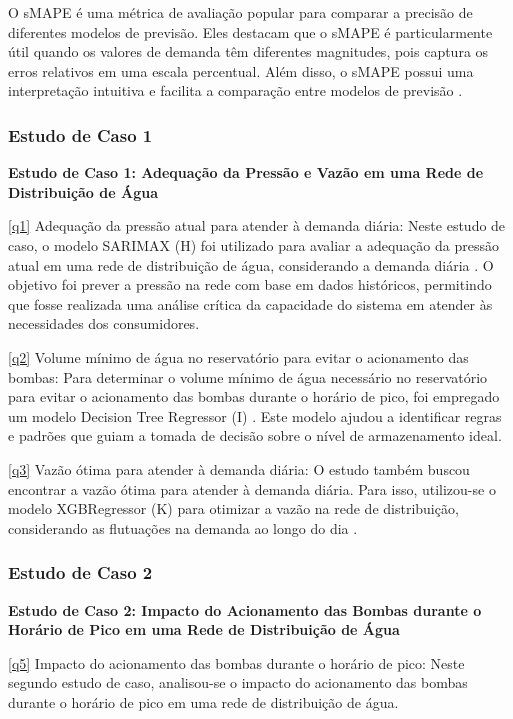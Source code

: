 O sMAPE é uma métrica de avaliação popular para comparar a precisão de diferentes modelos de previsão. Eles destacam que o sMAPE é particularmente útil quando os valores de demanda têm diferentes magnitudes, pois captura os erros relativos em uma escala percentual. Além disso, o sMAPE possui uma interpretação intuitiva e facilita a comparação entre modelos de previsão \cite{hyndman2006effect}.

\subsubsection{Estudo de Caso 1}

\noindent\textbf{Estudo de Caso 1: Adequação da Pressão e Vazão em uma Rede de Distribuição de Água}

\eqref{q1} Adequação da pressão atual para atender à demanda diária: Neste estudo de caso, o modelo SARIMAX (H) foi utilizado para avaliar a adequação da pressão atual em uma rede de distribuição de água, considerando a demanda diária \cite{2-s2.0-85099424908}. O objetivo foi prever a pressão na rede com base em dados históricos, permitindo que fosse realizada uma análise crítica da capacidade do sistema em atender às necessidades dos consumidores.

\eqref{q2} Volume mínimo de água no reservatório para evitar o acionamento das bombas: Para determinar o volume mínimo de água necessário no reservatório para evitar o acionamento das bombas durante o horário de pico, foi empregado um modelo Decision Tree Regressor (I) \cite{2-s2.0-85054695177}. Este modelo ajudou a identificar regras e padrões que guiam a tomada de decisão sobre o nível de armazenamento ideal.

\eqref{q3} Vazão ótima para atender à demanda diária: O estudo também buscou encontrar a vazão ótima para atender à demanda diária. Para isso, utilizou-se o modelo XGBRegressor (K) para otimizar a vazão na rede de distribuição, considerando as flutuações na demanda ao longo do dia \cite{2-s2.0-85130441623}.

\subsubsection{Estudo de Caso 2}

\noindent\textbf{Estudo de Caso 2: Impacto do Acionamento das Bombas durante o Horário de Pico em uma Rede de Distribuição de Água}

\eqref{q5} Impacto do acionamento das bombas durante o horário de pico: Neste segundo estudo de caso, analisou-se o impacto do acionamento das bombas durante o horário de pico em uma rede de distribuição de água.


